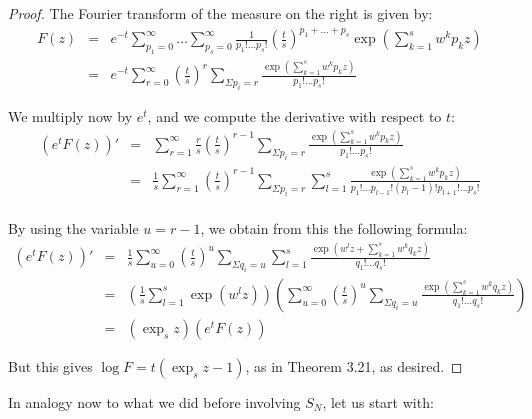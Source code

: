 \documentclass[12pt]{amsbook}
\begin{document}
\begin{proof}
The Fourier transform of the measure on the right is given by:
\begin{eqnarray*}
F(z)
&=&e^{-t}\sum_{p_1=0}^\infty\ldots\sum_{p_s=0}^\infty\frac{1}{p_1!\ldots p_s!}\left(\frac{t}{s}\right)^{p_1+\ldots+p_s}\exp\left(\sum_{k=1}^sw^kp_kz\right)\\
&=&e^{-t}\sum_{r=0}^\infty\left(\frac{t}{s}\right)^r\sum_{\Sigma p_i=r}\frac{\exp\left(\sum_{k=1}^sw^kp_kz\right)}{p_1!\ldots p_s!}
\end{eqnarray*}

We multiply now by $e^t$, and we compute the derivative with respect to $t$:
\begin{eqnarray*}
(e^tF(z))'
&=&\sum_{r=1}^\infty\frac{r}{s}\left(\frac{t}{s}\right)^{r-1}\sum_{\Sigma p_i=r}\frac{\exp\left(\sum_{k=1}^sw^kp_kz\right)}{p_1!\ldots p_s!}\\
&=&\frac{1}{s}\sum_{r=1}^\infty\left(\frac{t}{s}\right)^{r-1}\sum_{\Sigma p_i=r}\sum_{l=1}^s\frac{\exp\left(\sum_{k=1}^sw^kp_kz\right)}{p_1!\ldots p_{l-1}!(p_l-1)!p_{l+1}!\ldots p_s!}\\
\end{eqnarray*}

By using the variable $u=r-1$, we obtain from this the following formula:
\begin{eqnarray*}
(e^tF(z))'
&=&\frac{1}{s}\sum_{u=0}^\infty\left(\frac{t}{s}\right)^u\sum_{\Sigma q_i=u}\sum_{l=1}^s\frac{\exp\left(w^lz+\sum_{k=1}^sw^kq_kz\right)}{q_1!\ldots q_s!}\\
&=&\left(\frac{1}{s}\sum_{l=1}^s\exp(w^lz)\right)\left(\sum_{u=0}^\infty\left(\frac{t}{s}\right)^u\sum_{\Sigma q_i=u}\frac{\exp\left(\sum_{k=1}^sw^kq_kz\right)}{q_1!\ldots q_s!}\right)\\
&=&(\exp_sz)(e^tF(z))
\end{eqnarray*}

But this gives $\log F=t(\exp_sz-1)$, as in Theorem 3.21, as desired.
\end{proof}

In analogy now to what we did before involving $S_N$, let us start with:

\end{document}
